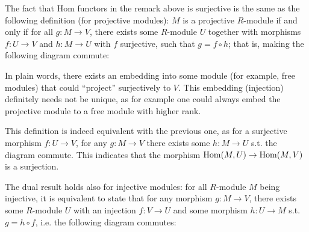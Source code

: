 \documentclass{article}
\begin{document}
\begin{remark}\label{rmk:Alt def for projective module}
    The fact that Hom functors in the remark above is surjective is the same as the following definition (for projective modules): $M$ is a projective $R$-module if and only if for all $g: M \to V$, there exists some $R$-module $U$ together with morphisms $f: U \to V$ and $h: M \to U$ with $f$ surjective, such that $g = f \circ h$; that is, making the following diagram commute:
    \begin{figure}[htbp]
        \centering
    \end{figure}

    In plain words, there exists an embedding into some module (for example, free modules) that could ``project'' surjectively to $V$. This embedding (injection) definitely needs not be unique, as for example one could always embed the projective module to a free module with higher rank. 
    
    This definition is indeed equivalent with the previous one, as for a surjective morphism $f: U \to V$, for any $g: M \to V$ there exists some $h: M \to U$ s.t. the diagram commute. This indicates that the morphism $\mathrm{Hom}(M, U) \to \mathrm{Hom}(M, V)$ is a surjection.
    
    The dual result holds also for injective modules: for all $R$-module $M$ being injective, it is equivalent to state that for any morphism $g: M \to V$, there exists some $R$-module $U$ with an injection $f: V \to U$ and some morphism $h: U \to M$ s.t. $g = h \circ f$, i.e. the following diagram commutes:
    \begin{figure}[htbp]
        \centering
    \end{figure}
\end{remark}
\end{document}

